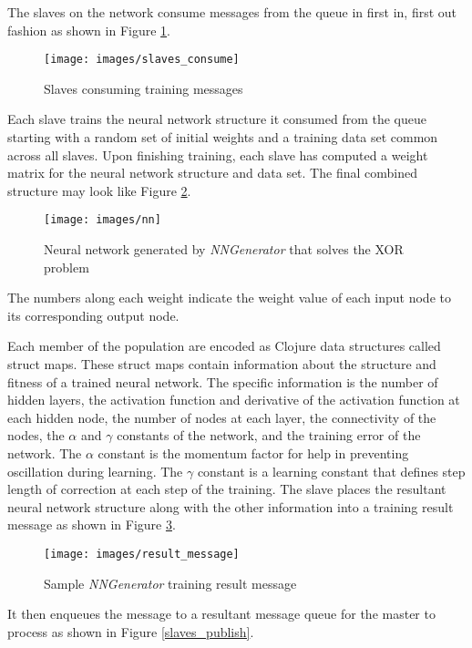 The slaves on the network consume messages from the queue in first in, first out fashion as shown in Figure \ref{slaves_consume}.

\begin{figure}[h!]
  \centering
  \texttt{[image: images/slaves\_consume]}
  \caption{Slaves consuming training messages}
  \label{slaves_consume}
\end{figure}

Each slave trains the neural network structure it consumed from the queue starting with a random set of initial weights and a training data set common across all slaves.
Upon finishing training, each slave has computed a weight matrix for the neural network structure and data set.
The final combined structure may look like Figure \ref{nn_combined}. 

\begin{figure}[h!]
  \centering
  \texttt{[image: images/nn]}
  \caption{Neural network generated by {\it NNGenerator} that solves the XOR problem}
  \label{nn_combined}
\end{figure}

The numbers along each weight indicate the weight value of each input node to its corresponding output node. 

Each member of the population are encoded as Clojure data structures called struct maps. 
These struct maps contain information about the structure and fitness of a trained neural network. 
The specific information is the number of hidden layers, the activation function and derivative of the activation function at each hidden node, the number of nodes at each layer, the connectivity of the nodes, the $\alpha$ and $\gamma$ constants of the network, and the training error of the network. 
The $\alpha$ constant is the momentum factor for help in preventing oscillation during learning. 
The $\gamma$ constant is a learning constant that defines step length of correction at each step of the training.
The slave places the resultant neural network structure along with the other information into a training result message as shown in Figure \ref{result_message}.

\begin{figure}[h!]
  \centering
  \texttt{[image: images/result\_message]}
  \caption{Sample {\it NNGenerator} training result message}
  \label{result_message}
\end{figure}

It then enqueues the message to a resultant message queue for the master to process as shown in Figure \ref{slaves_publish}.


